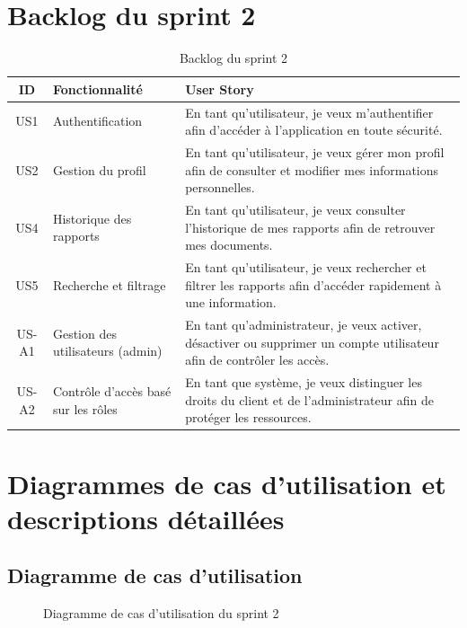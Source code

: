 \section{Backlog du sprint 2}
\begin{table}[h!]
\centering
\caption{Backlog du sprint 2}
\label{tab:backlog-sprint2}
\renewcommand{\arraystretch}{1.3}
\begin{tabularx}{\textwidth}{|c|l|X|}
\hline
\textbf{ID} & \textbf{Fonctionnalité} & \textbf{User Story} \\ \hline
US1 & Authentification &
En tant qu'utilisateur, je veux m'authentifier afin d'accéder à l'application en
toute sécurité. \\ \hline
US2 & Gestion du profil &
En tant qu'utilisateur, je veux gérer mon profil afin de consulter et modifier mes
informations personnelles. \\ \hline
US4 & Historique des rapports &
En tant qu'utilisateur, je veux consulter l'historique de mes rapports afin de
retrouver mes documents. \\ \hline
US5 & Recherche et filtrage &
En tant qu'utilisateur, je veux rechercher et filtrer les rapports afin d'accéder
rapidement à une information. \\ \hline
US-A1 & Gestion des utilisateurs (admin) &
En tant qu'administrateur, je veux activer, désactiver ou supprimer un compte
utilisateur afin de contrôler les accès. \\ \hline
US-A2 & Contrôle d'accès basé sur les rôles &
En tant que système, je veux distinguer les droits du client et de l'administrateur
afin de protéger les ressources. \\ \hline
\end{tabularx}
\end{table}

\section{Diagrammes de cas d'utilisation et descriptions détaillées}

\subsection{Diagramme de cas d'utilisation}
\begin{figure}[h!]
\centering
{}
\caption{Diagramme de cas d'utilisation du sprint 2}
\end{figure}

